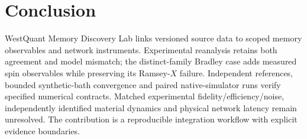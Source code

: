 \documentclass[11pt,a4paper]{article}
\begin{document}
\section{Conclusion}
WestQuant Memory Discovery Lab links versioned source data to scoped memory observables and network instruments. Experimental reanalysis retains both agreement and model mismatch; the distinct-family Bradley case adds measured spin observables while preserving its Ramsey-$X$ failure. Independent references, bounded synthetic-bath convergence and paired native-simulator runs verify specified numerical contracts. Matched experimental fidelity/efficiency/noise, independently identified material dynamics and physical network latency remain unresolved. The contribution is a reproducible integration workflow with explicit evidence boundaries.
\end{document}
